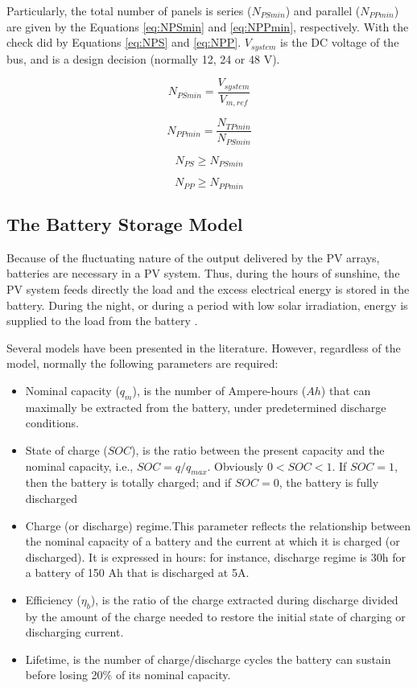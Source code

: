 \documentclass[journal]{IEEEtran}
\begin{document}
Particularly, the total number of panels is series ($ N_{PSmin} $) and parallel ($ N_{PPmin} $) are given by the Equations \ref{eq:NPSmin} and \ref{eq:NPPmin}, respectively. With the check did by Equations \ref{eq:NPS} and \ref{eq:NPP}. $ V_{system} $ is the DC voltage of the bus, and is a design decision (normally 12, 24 or 48 V).

\begin{equation}
\label{eq:NPSmin}
N_{PSmin} = \dfrac{V_{system}}{V_{m,ref}}
\end{equation}

\begin{equation}
\label{eq:NPPmin}
N_{PPmin} = \dfrac{N_{TPmin}}{N_{PSmin}}
\end{equation}

\begin{equation}
\label{eq:NPS}
N_{PS} \geq N_{PSmin}
\end{equation}

\begin{equation}
\label{eq:NPP}
N_{PP} \geq N_{PPmin}
\end{equation}


\subsection{The Battery Storage Model }
Because of the fluctuating nature of the output delivered by the PV arrays, batteries are necessary in a PV system. Thus, during the hours of sunshine, the PV system feeds directly the load and the excess electrical energy is stored in the battery. During the night, or during a period with low solar irradiation, energy is supplied to the load from the battery \cite{Mellit}.
  
Several models have been presented in the literature. However, regardless of the model, normally the following parameters are required: 

\begin{itemize}
\item Nominal capacity ($ q_{m} $), is the number of Ampere-hours ($ Ah $) that can maximally be extracted from the battery, under predetermined discharge conditions.
\item State of charge ($ SOC $), is the ratio between the present capacity and the nominal capacity, i.e., $ SOC = q/q_{max} $. Obviously $ 0<SOC<1 $. If $ SOC=1 $, then the battery is totally charged; and if $ SOC=0 $, the battery is fully discharged
\item Charge (or discharge) regime.This parameter reflects the relationship between the nominal capacity of a battery and the current at which it is charged (or discharged). It is expressed in hours: for instance, discharge regime is 30h for a battery of 150 Ah that is discharged at 5A.
\item Efficiency ($\eta_{b}$), is the ratio of the charge extracted during discharge divided by the amount of the charge needed to restore the initial state of charging or discharging current. 
\item Lifetime, is the number of charge/discharge cycles the battery can sustain before losing 20\% of its nominal capacity.
\end{itemize}
\end{document}
